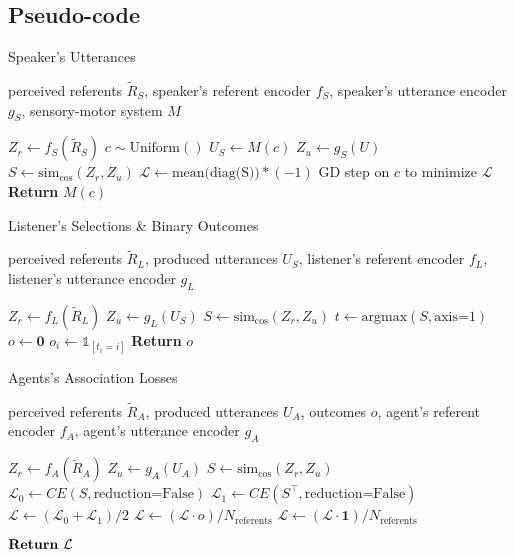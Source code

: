 \subsection{Pseudo-code}
\textbf{ }
\begin{algorithm}
\caption{Speaker's Utterances}\label{alg:sp}
\begin{algorithmic}

\REQUIRE perceived referents $\tilde{R}_S$, speaker's referent encoder $f_S$, speaker's utterance encoder $g_S$, sensory-motor system $M$

\STATE $Z_r \gets f_S(\tilde{R}_S) $
\STATE $c \sim \textrm{Uniform}()$
    \STATE $U_S \gets M(c)$
    \STATE $Z_u \gets g_S(U)$
    \STATE $S \gets \textrm{sim}_{\textrm{cos}}(Z_r,Z_u)$
    \STATE $\mathcal{L} \gets \textrm{mean(diag(S))} * (-1)$
    \STATE GD step on $c$ to minimize $\mathcal{L}$
\ENDFOR
\STATE \textrm{\textbf{Return} }$M(c)$
\end{algorithmic}
\end{algorithm}

\begin{algorithm}
\caption{Listener's Selections \& Binary Outcomes}\label{alg:ls}
\begin{algorithmic}

\REQUIRE perceived referents $\tilde{R}_L$, produced utterances $U_S$, listener's referent encoder $f_L$, listener's utterance encoder $g_L$

\STATE $Z_r \gets f_L(\tilde{R}_L) $
\STATE $Z_u \gets g_L(U_S) $
\STATE $S\gets \textrm{sim}_{\textrm{cos}}(Z_r,Z_u)$
\STATE $t \gets \textrm{argmax}(S, \textrm{axis=}1)$
\STATE $o \gets \textbf{0}$
    \STATE $o_i \gets \mathds{1}_{[t_i = i]}$
\ENDFOR
\STATE \textrm{\textbf{Return} }$o$
\end{algorithmic}
\end{algorithm}

\begin{algorithm}
\caption{Agents's Association Losses}\label{alg:al}
\begin{algorithmic}

\REQUIRE perceived referents $\tilde{R}_A$, produced utterances $U_A$, outcomes $o$, agent's referent encoder $f_A$, agent's utterance encoder $g_A$

\STATE $Z_r \gets f_A(\tilde{R}_A) $
\STATE $Z_u \gets g_A(U_A) $
\STATE $S\gets \textrm{sim}_{\textrm{cos}}(Z_r,Z_u)$
\STATE $\mathcal{L}_0 \gets CE(S, \textrm{reduction=False})$
\STATE $\mathcal{L}_1 \gets CE(S^{\top},\textrm{reduction=False})$
\STATE $\mathcal{L} \gets (\mathcal{L}_0 + \mathcal{L}_1)/2$
    \STATE $\mathcal{L} \gets (\mathcal{L} \cdot o) / N_{\textrm{referents}}$
\ELSE
    \STATE $\mathcal{L} \gets (\mathcal{L} \cdot \textbf{1}) / N_{\textrm{referents}}$
\ENDIF 

\STATE $\textrm{\textbf{Return} } \mathcal{L}$
\end{algorithmic}
\end{algorithm}

